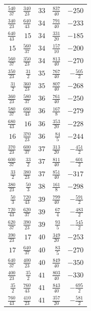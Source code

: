{\begin{longtable}{@{\extracolsep{\fill}}rrrrr}
$\frac{540}{37}$ & $\frac{340}{23}$ & $33$ & $\frac{837}{40}$ & $-250$ \\
$\frac{340}{23}$ & $\frac{640}{43}$ & $34$ & $\frac{791}{40}$ & $-233$ \\
$\frac{640}{43}$ & $15$ & $34$ & $\frac{331}{20}$ & $-185$ \\
$15$ & $\frac{560}{37}$ & $34$ & $\frac{157}{10}$ & $-200$ \\
$\frac{560}{37}$ & $\frac{350}{23}$ & $34$ & $\frac{813}{40}$ & $-270$ \\
$\frac{350}{23}$ & $\frac{31}{2}$ & $35$ & $\frac{767}{40}$ & $-\frac{505}{2}$ \\
$\frac{31}{2}$ & $\frac{360}{23}$ & $35$ & $\frac{807}{40}$ & $-268$ \\
$\frac{360}{23}$ & $\frac{580}{37}$ & $36$ & $\frac{761}{40}$ & $-250$ \\
$\frac{580}{37}$ & $\frac{680}{43}$ & $36$ & $\frac{167}{8}$ & $-279$ \\
$\frac{680}{43}$ & $16$ & $36$ & $\frac{353}{20}$ & $-228$ \\
$16$ & $\frac{370}{23}$ & $36$ & $\frac{84}{5}$ & $-244$ \\
$\frac{370}{23}$ & $\frac{600}{37}$ & $37$ & $\frac{313}{20}$ & $-\frac{451}{2}$ \\
$\frac{600}{37}$ & $\frac{33}{2}$ & $37$ & $\frac{811}{40}$ & $-\frac{601}{2}$ \\
$\frac{33}{2}$ & $\frac{380}{23}$ & $37$ & $\frac{851}{40}$ & $-317$ \\
$\frac{380}{23}$ & $\frac{50}{3}$ & $38$ & $\frac{161}{8}$ & $-298$ \\
$\frac{50}{3}$ & $\frac{720}{43}$ & $39$ & $\frac{799}{40}$ & $-\frac{591}{2}$ \\
$\frac{720}{43}$ & $\frac{620}{37}$ & $39$ & $\frac{67}{4}$ & $-\frac{483}{2}$ \\
$\frac{620}{37}$ & $\frac{390}{23}$ & $39$ & $\frac{93}{5}$ & $-\frac{545}{2}$ \\
$\frac{390}{23}$ & $17$ & $40$ & $\frac{349}{20}$ & $-253$ \\
$17$ & $\frac{640}{37}$ & $40$ & $\frac{83}{5}$ & $-270$ \\
$\frac{640}{37}$ & $\frac{400}{23}$ & $40$ & $\frac{849}{40}$ & $-350$ \\
$\frac{400}{23}$ & $\frac{35}{2}$ & $41$ & $\frac{803}{40}$ & $-330$ \\
$\frac{35}{2}$ & $\frac{760}{43}$ & $41$ & $\frac{843}{40}$ & $-\frac{695}{2}$ \\
$\frac{760}{43}$ & $\frac{410}{23}$ & $41$ & $\frac{357}{20}$ & $-\frac{581}{2}$ \\

\end{longtable}}
